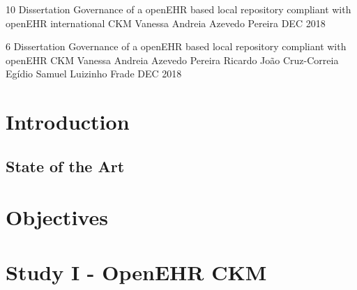 \documentclass[a4paper, twoside, openright]{report}
\begin{document}
\setcounter{page}{1}

\frontCover
{10}
{Dissertation}
{Governance of a openEHR based local repository compliant with openEHR international CKM}
{Vanessa Andreia Azevedo Pereira}
{DEC}
{2018}

\innerCover
{6}
{Dissertation}
{Governance of a openEHR based local repository 
compliant with openEHR CKM}
{Vanessa Andreia Azevedo Pereira}
{Ricardo João Cruz-Correia}
{Egídio Samuel Luizinho Frade}
{DEC}
{2018}











\tableofcontents

\listoffigures

\listoftables



\chapter{Introduction}

\section{State of the Art}



\chapter{Objectives}


\chapter{Study I - OpenEHR CKM}

\end{document}
